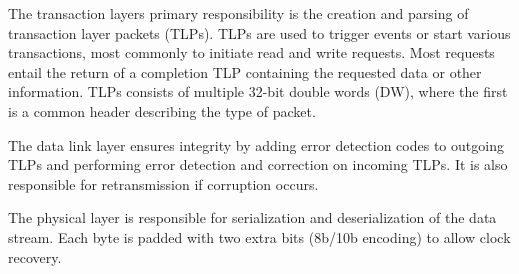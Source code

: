 The transaction layers primary responsibility is the creation and parsing of transaction layer packets (TLPs).
TLPs are used to trigger events or start various transactions, most commonly to initiate read and write requests\footnotemark.
Most requests entail the return of a completion TLP containing the requested data or other information.
TLPs consists of multiple 32-bit double words (DW), where the first is a common header describing the type of packet.

The data link layer ensures integrity by adding error detection codes to outgoing TLPs and performing error detection and correction on incoming TLPs.
It is also responsible for retransmission if corruption occurs.

The physical layer is responsible for serialization and deserialization of the data stream.
Each byte is padded with two extra bits (8b/10b encoding) to allow clock recovery.

